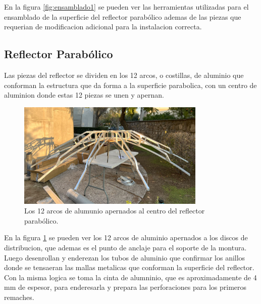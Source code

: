En la figura \ref{fig:ensamblado1} se pueden ver las herramientas utilizadas para el ensamblado de la superficie del reflector parabólico ademas de las piezas que requerian de modificacion adicional para la instalacion correcta.\\

\subsection{Reflector Parabólico}

Las piezas del reflector se dividen en los 12 arcos, o costillas, de aluminio que conforman la estructura que da forma a la superficie parabolica, con un centro de aluminion donde estas 12 piezas se unen y apernan.\\

\begin{figure}
    \centering
    \includegraphics[width=0.8\textwidth]{img/estructura1}
    \caption{Los 12 arcos de alumunio apernados al centro del reflector parabólico.}
    \label{fig:ensamble2}
\end{figure}

En la figura \ref{fig:ensamble2} se pueden ver los 12 arcos de aluminio apernados a los discos de distribucion, que ademas es el punto de anclaje para el soporte de la montura.\\

Luego desenrollan y enderezan los tubos de aluminio que confirmar los anillos donde se tensaeran las mallas metalicas que conforman la superficie del reflector. Con la misma logica se toma la cinta de alumninio, que es aproximadamente de 4 mm de espesor, para enderesarla y prepara las perforaciones para los primeros remaches.\\

